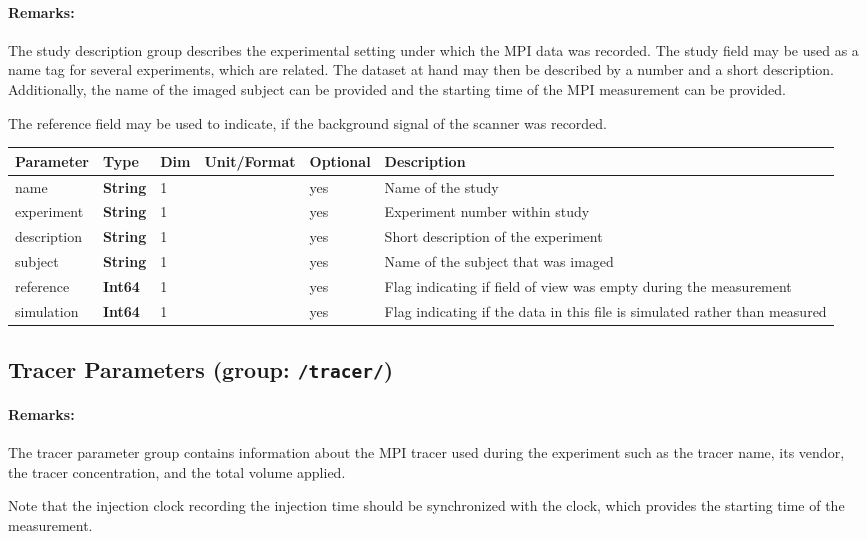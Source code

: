 \documentclass[landscape]{article} %
\newcommand{\inl}[1]{\lstinline[columns=fixed]{#1}}
\newcommand{\inltab}[1]{{\ttfamily\bfseries\color{blue}#1}}
\newcommand{\inlvar}[1]{{\ttfamily#1}}
\begin{document}
\begin{multicols}{2}

\paragraph{Remarks:} The study description group describes the experimental setting under which the MPI data was recorded. The study field may be used as a name tag for several experiments, which are related. The dataset at hand may then be described by a number and a short description. Additionally, the name of the imaged subject can be provided and the starting time of the MPI measurement can be provided.

The reference field may be used to indicate, if the background signal of the scanner was recorded.

\end{multicols}


\noindent \begin{tabularx}{\columnwidth}{lllllX} 
\textbf{Parameter} & \textbf{Type} & \textbf{Dim} & \textbf{Unit/Format} & \textbf{Optional} & \textbf{Description} \\ \hline 
\inlvar{name} & \inltab{String} & 1 & & yes & Name of the study \\ \hline
\inlvar{experiment} & \inltab{String} & 1 & & yes & Experiment number within study \\ \hline
\inlvar{description} & \inltab{String} & 1 & & yes & Short description of the experiment \\ \hline
\inlvar{subject} & \inltab{String} & 1 & & yes & Name of the subject that was imaged \\ \hline 
\inlvar{reference} & \inltab{Int64} & 1 & & yes & Flag indicating if field of view was empty during the measurement \\ \hline
\inlvar{simulation} & \inltab{Int64} & 1 & & yes & Flag indicating if the data in this file is simulated rather than measured \\ \hline
\end{tabularx}


\subsection{Tracer Parameters (group: \inl{/tracer/})}

\begin{multicols}{2}

\paragraph{Remarks:} The tracer parameter group contains information about the MPI tracer used during the experiment such as the tracer name, its vendor, the tracer concentration, and the total volume applied.

Note that the injection clock recording the injection time should be synchronized with the clock, which provides the starting time of the measurement.

\end{multicols}
\end{document}
